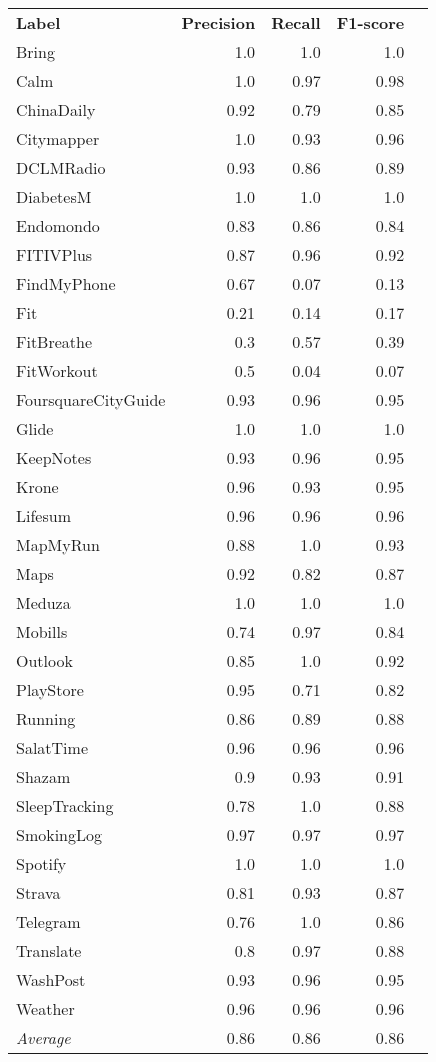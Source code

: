 \begin{tabular}{lrrrr}
    \textbf{Label} & \textbf{Precision} & \textbf{Recall} & \textbf{F1-score} \\
    Bring & 1.0 & 1.0 & 1.0 \\
    Calm & 1.0 & 0.97 & 0.98 \\
    ChinaDaily & 0.92 & 0.79 & 0.85 \\
    Citymapper & 1.0 & 0.93 & 0.96 \\
    DCLMRadio & 0.93 & 0.86 & 0.89 \\
    DiabetesM & 1.0 & 1.0 & 1.0 \\
    Endomondo & 0.83 & 0.86 & 0.84 \\
    FITIVPlus & 0.87 & 0.96 & 0.92 \\
    FindMyPhone & 0.67 & 0.07 & 0.13 \\
    Fit & 0.21 & 0.14 & 0.17 \\
    FitBreathe & 0.3 & 0.57 & 0.39 \\
    FitWorkout & 0.5 & 0.04 & 0.07 \\
    FoursquareCityGuide & 0.93 & 0.96 & 0.95 \\
    Glide & 1.0 & 1.0 & 1.0 \\
    KeepNotes & 0.93 & 0.96 & 0.95 \\
    Krone & 0.96 & 0.93 & 0.95 \\
    Lifesum & 0.96 & 0.96 & 0.96 \\
    MapMyRun & 0.88 & 1.0 & 0.93 \\
    Maps & 0.92 & 0.82 & 0.87 \\
    Meduza & 1.0 & 1.0 & 1.0 \\
    Mobills & 0.74 & 0.97 & 0.84 \\
    Outlook & 0.85 & 1.0 & 0.92 \\
    PlayStore & 0.95 & 0.71 & 0.82 \\
    Running & 0.86 & 0.89 & 0.88 \\
    SalatTime & 0.96 & 0.96 & 0.96 \\
    Shazam & 0.9 & 0.93 & 0.91 \\
    SleepTracking & 0.78 & 1.0 & 0.88 \\
    SmokingLog & 0.97 & 0.97 & 0.97 \\
    Spotify & 1.0 & 1.0 & 1.0 \\
    Strava & 0.81 & 0.93 & 0.87 \\
    Telegram & 0.76 & 1.0 & 0.86 \\
    Translate & 0.8 & 0.97 & 0.88 \\
    WashPost & 0.93 & 0.96 & 0.95 \\
    Weather & 0.96 & 0.96 & 0.96 \\
    \emph{Average} & 0.86 & 0.86 & 0.86 \\
\end{tabular}